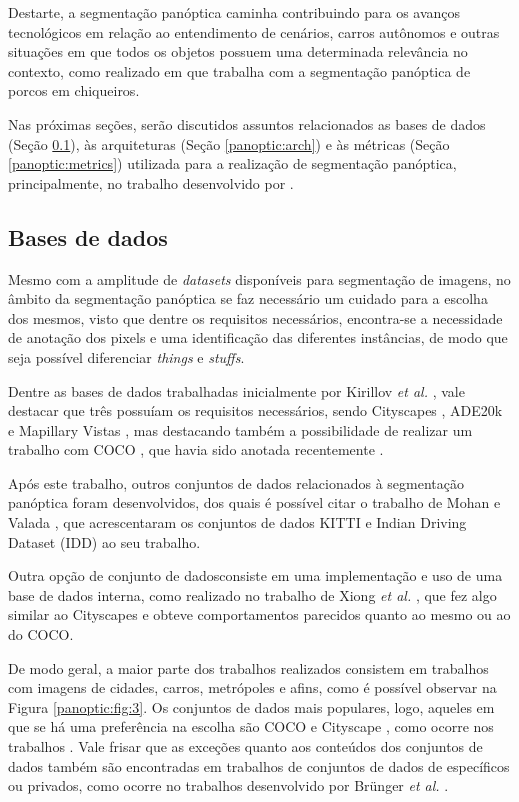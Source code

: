 Destarte, a segmentação panóptica caminha contribuindo para os avanços tecnológicos em relação ao entendimento de cenários, carros autônomos \cite{Liu2019} e outras situações em que todos os objetos possuem uma determinada relevância no contexto, como realizado em \cite{Brunger2020} que trabalha com a segmentação panóptica de porcos em chiqueiros.

Nas próximas seções, serão discutidos assuntos relacionados as bases de dados (Seção \ref{panoptic:dataset}), às arquiteturas (Seção \ref{panoptic:arch}) e às métricas (Seção \ref{panoptic:metrics}) utilizada para a realização de segmentação panóptica, principalmente, no trabalho desenvolvido por \cite{Kirillov2019a}.


\subsection{Bases de dados}
\label{panoptic:dataset}
Mesmo com a amplitude de \textit{datasets} disponíveis para segmentação de imagens, no âmbito da segmentação panóptica se faz necessário um cuidado para a escolha dos mesmos, visto que dentre os requisitos necessários, encontra-se a necessidade de anotação dos pixels e uma identificação das diferentes instâncias, de modo que seja possível diferenciar \textit{things} e \textit{stuffs}.

Dentre as bases de dados trabalhadas inicialmente por Kirillov \textit{et al.} \cite{Kirillov2019a}, vale destacar que três possuíam os requisitos necessários, sendo Cityscapes \cite{Cordts2016}, ADE20k \cite{Zhou2016} e Mapillary Vistas \cite{Neuhold2017_ICCV}, mas destacando também a possibilidade de realizar um trabalho com COCO \cite{Lin2014}, que havia sido anotada recentemente \cite{Kirillov2019a}.

Após este trabalho, outros conjuntos de dados relacionados à segmentação panóptica foram desenvolvidos, dos quais é possível citar o trabalho de Mohan e Valada \cite{Mohan2020}, que acrescentaram os conjuntos de dados KITTI \cite{Geiger2013} e Indian Driving Dataset (IDD) \cite{Varma2018} ao seu trabalho.

Outra opção de conjunto de dadosconsiste em uma implementação e uso de uma base de dados interna, como realizado no trabalho de Xiong \textit{et al.} \cite{Xiong2019}, que fez algo similar ao Cityscapes e obteve comportamentos parecidos quanto ao mesmo ou ao do COCO.

De modo geral, a maior parte dos trabalhos realizados consistem em trabalhos com imagens de cidades, carros, metrópoles e afins, como é possível observar na Figura \ref{panoptic:fig:3}. Os conjuntos de dados mais populares, logo, aqueles em que se há uma preferência na escolha são COCO \cite{Caesar2016, Lin2014} e Cityscape \cite{Cordts2016}, como ocorre nos trabalhos \cite{Chen2019, DeGeus2019a, DeGeus2019, Hou2019, Liu2019, Xiong2019}. Vale frisar que as exceções quanto aos conteúdos dos conjuntos de dados também são encontradas em trabalhos de conjuntos de dados de específicos ou privados, como ocorre no trabalhos desenvolvido por Brünger \textit{et al.} \cite{Brunger2020}.

